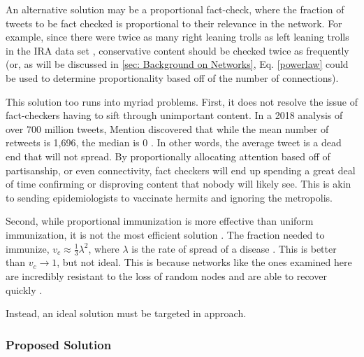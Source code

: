 \documentclass[preprint,review,12pt]{elsarticle}
\begin{document}
 An alternative solution may be a proportional fact-check, where the fraction of tweets to be fact checked is proportional to their relevance in the network. For example, since there were twice as many right leaning trolls as left leaning trolls in the IRA data set \cite{freelon2020black,badawy2018analyzing,benkler2018network}, conservative content should be checked twice as frequently (or, as will be discussed in \ref{sec: Background on Networks}, Eq. \ref{powerlaw} could be used to determine proportionality based off of the number of connections).
 
 This solution too runs into myriad problems. First, it does not resolve the issue of fact-checkers having to sift through unimportant content. In a 2018 analysis of over 700 million tweets, Mention discovered that while the mean number of retweets is 1,696, the median is 0 \citep{mention2018twitter}. In other words, the average tweet is a dead end that will not spread. By proportionally allocating attention based off of partisanship, or even connectivity, fact checkers will end up spending a great deal of time confirming or disproving content that nobody will likely see. This is akin to sending epidemiologists to vaccinate hermits and ignoring the metropolis. 

Second, while proportional immunization is more effective than uniform immunization, it is not the most efficient solution \cite{dezsHo2002halting,anderson1992infectious}. The fraction needed to immunize, $v_c \approx \frac{1}{3}\lambda^2$, where $\lambda$ is the rate of spread of a disease \cite{pastor2002immunization,barabasi1999emergence}. This is better than $v_c \rightarrow 1$, but not ideal. This is because networks like the ones examined here are incredibly resistant to the loss of random nodes and are able to recover quickly \cite{cohen2001breakdown,callaway2000network,albert2000error}.

Instead, an ideal solution must be targeted in approach.
 
 
 
 \subsubsection{Proposed Solution}
 \label{sec: proposed solution}
 
\end{document}
